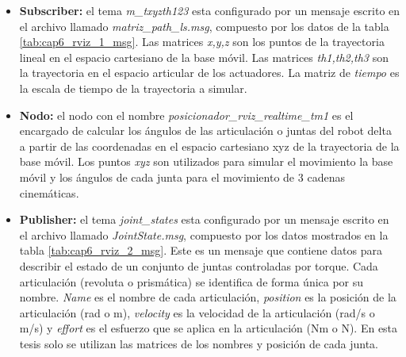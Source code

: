     \begin{itemize}
        \item {\textbf{Subscriber:} el tema \textit{m\_txyzth123} esta configurado por un mensaje escrito en el archivo llamado \textit{matriz\_path\_ls.msg}, compuesto por los datos de la tabla \eqref{tab:cap6_rviz_1_msg}. Las matrices \textit{x,y,z} son los puntos de la trayectoria lineal  en el espacio cartesiano de la base móvil. Las matrices \textit{th1,th2,th3} son la trayectoria en el espacio articular de los actuadores. La matriz de \textit{tiempo} es la escala de tiempo de la trayectoria a simular.}
        \item {\textbf{Nodo:} el nodo con el nombre \textit{posicionador\_rviz\_realtime\_tm1} es el encargado de calcular los ángulos de las articulación o juntas del robot delta a partir de las coordenadas en el espacio cartesiano xyz  de la trayectoria de la base móvil. Los puntos \textit{xyz} son utilizados para simular el movimiento la base móvil y los ángulos de cada junta para el movimiento de 3 cadenas cinemáticas.}
        \item {\textbf{Publisher:}  el tema \textit{joint\_states} esta configurado por un mensaje escrito en el archivo llamado \textit{JointState.msg}, compuesto por los datos mostrados en la tabla \eqref{tab:cap6_rviz_2_msg}. Este es un mensaje que contiene datos para describir el estado de un conjunto de juntas controladas por torque. Cada articulación (revoluta o prismática) se identifica de forma única por su nombre. \textit{Name} es el nombre de cada articulación, \textit{position} es la posición de la articulación (rad o m), \textit{velocity} es la velocidad de la articulación (rad/s o m/s) y \textit{effort} es el esfuerzo que se aplica en la articulación (Nm o N). En esta tesis solo se utilizan las matrices de los nombres y posición de cada junta.}
    \end{itemize} 
    
